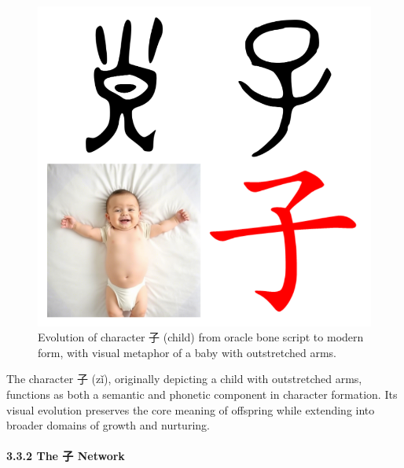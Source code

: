 \begin{figure}
\centering
\includegraphics{./images/zi_child.png}
\caption{Evolution of character 子 (child) from oracle bone script to
modern form, with visual metaphor of a baby with outstretched arms.}
\end{figure}

The character 子 (zǐ), originally depicting a child with outstretched
arms, functions as both a semantic and phonetic component in character
formation. Its visual evolution preserves the core meaning of offspring
while extending into broader domains of growth and nurturing.

\paragraph{3.3.2 The 子 Network}\label{the-ux5b50-network}

